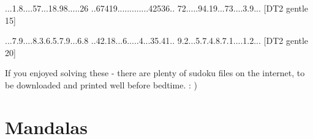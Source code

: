 \documentclass{article}
\begin{document}
\begin{comment}
\renewcommand*{\puzzlefile}{tg5.sud}
\writepuzzle%
{.6.1.9.8.}{.19...74.}{2.......1}%
{..79.26..}{.3.....2.}{..14.35..}%
{1.......5}{.75...23.}{.9.5.6.7.}%
[DT2 gentle 5]
\vfill
\begin{minipage}{0.95\linewidth}\begin{center}
\sudoku{tg5.sud}
\end{center}\end{minipage}

\renewcommand*{\puzzlefile}{tg10.sud}
\writepuzzle%
{....96..4}{..1.....2}{56...8...}%
{2.8....9.}{9.63.52.7}{.3....4.6}%
{...9...58}{7.....9..}{8..45....}%
[DT2 gentle 10]
\vfill
\begin{minipage}{0.95\linewidth}\begin{center}
\sudoku{tg10.sud}
\end{center}\end{minipage}

\end{comment}

\renewcommand*{\puzzlefile}{tg15.sud}
\writepuzzle%
{...1.8...}{.57...18.}{98.....26}%
{..67419..}{.........}{..42536..}%
{72.....94}{.19...73.}{...3.9...}%
[DT2 gentle 15]
\vfill
\begin{minipage}{0.95\linewidth}\begin{center}
\end{center}\end{minipage}

\renewcommand*{\puzzlefile}{tg20.sud}
\writepuzzle%
{...7.9...}{.8.3.6.5.}{7.9...6.8}%
{..42.18..}{.6.....4.}{..35.41..}%
{9.2...5.7}{.4.8.7.1.}{...1.2...}%
[DT2 gentle 20]
\vfill
\begin{minipage}{0.95\linewidth}\begin{center}
\end{center}\end{minipage}
\vspace{1cm}

If you enjoyed solving these - there are plenty of sudoku files on the internet, to be downloaded and printed well before bedtime. : )
\newpage
\section{Mandalas}
 \pagestyle{empty}
\end{document}
